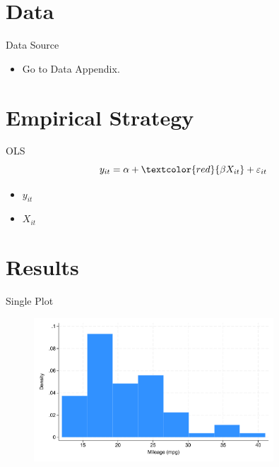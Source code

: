 \documentclass[aspectratio=169,11pt]{beamer}
\begin{document}
\section{Data}
\begin{frame}
\sectionpage
\end{frame}

\begin{frame}[label=data]{Data Source}
    \begin{itemize}
        \item Go to Data Appendix. \hyperlink{data_appendix}{}
    \end{itemize}
    
\end{frame}


\section{Empirical Strategy}
\begin{frame}
\sectionpage
\end{frame}

\begin{frame}{OLS}
    \begin{equation}
        y_{it} = \alpha + \textcolor{red}{\beta X_{it}} + \varepsilon_{it}
    \end{equation}
    \begin{itemize}
        \item $y_{it}$
        \item $X_{it}$
    \end{itemize}
\end{frame}

\section{Results}
\begin{frame}
\sectionpage
\end{frame}

\begin{frame}{Single Plot}
    \begin{figure}
        \centering
        \includegraphics[width=0.8\textwidth]{fig/hist.pdf}
    \end{figure}
\end{frame}
\end{document}
